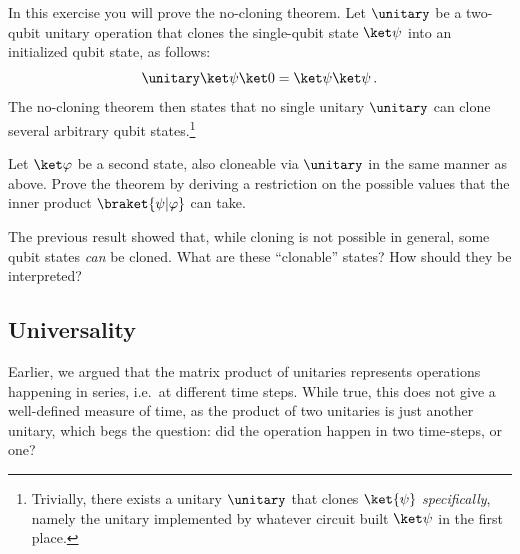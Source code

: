       \begin{exercise}
        In this exercise you will prove the no-cloning theorem.
          Let $\unitary$ be a two-qubit unitary operation that
          clones the single-qubit state $\ket\psi$ into an initialized qubit state,
          as follows:
          \[
            \unitary \ket\psi \ket 0 = \ket\psi \ket\psi\, .
          \]
          The no-cloning theorem then states that no single unitary
          $\unitary$ can clone several arbitrary qubit states.\footnote{
            Trivially, there exists a unitary $\unitary$ that clones
            $\ket{\psi}$ \emph{specifically}, namely the unitary implemented by
            whatever circuit built $\ket\psi$ in the first place.
          }
        \begin{subex}
          \item Let $\ket\varphi$ be a second state, also cloneable via 
            $\unitary$ in the same manner as above. 
            Prove the theorem by deriving a restriction on the possible values
            that the inner product $\braket{\psi|\varphi}$ can take.
          \item The previous result showed that, while cloning is not possible 
            in general, some qubit states \emph{can} be cloned.
            What are these ``clonable'' states? How should they be interpreted?
        \end{subex}
      \end{exercise}

  \subsection{Universality}\label{sec:universality}
      Earlier, we argued that the matrix product of unitaries represents
        operations happening in series, i.e.\ at different time steps. 
        While true, this does not give a well-defined measure of time, as 
        the product of two unitaries is just another unitary, which begs the
        question: did the operation happen in two time-steps, or one?

